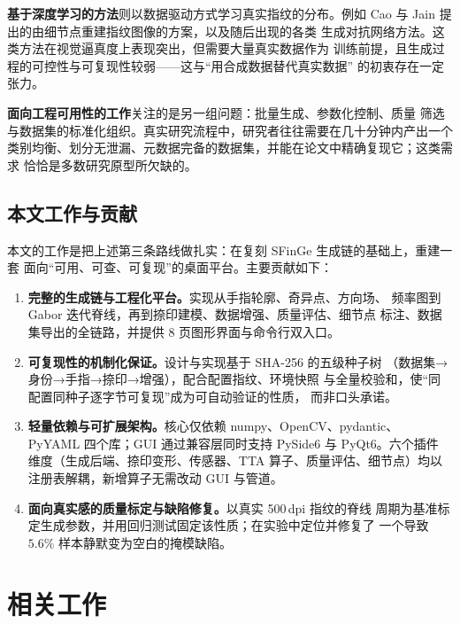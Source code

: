 \documentclass[UTF8, fontset=windows, a4paper, 11pt]{ctexart}
\begin{document}
\textbf{基于深度学习的方法}则以数据驱动方式学习真实指纹的分布。例如 Cao 与
Jain 提出的由细节点重建指纹图像的方案\cite{cao2015}，以及随后出现的各类
生成对抗网络方法。这类方法在视觉逼真度上表现突出，但需要大量真实数据作为
训练前提，且生成过程的可控性与可复现性较弱——这与``用合成数据替代真实数据''
的初衷存在一定张力。

\textbf{面向工程可用性的工作}关注的是另一组问题：批量生成、参数化控制、质量
筛选与数据集的标准化组织。真实研究流程中，研究者往往需要在几十分钟内产出一个
类别均衡、划分无泄漏、元数据完备的数据集，并能在论文中精确复现它；这类需求
恰恰是多数研究原型所欠缺的。

\subsection{本文工作与贡献}

本文的工作是把上述第三条路线做扎实：在复刻 SFinGe 生成链的基础上，重建一套
面向``可用、可查、可复现''的桌面平台。主要贡献如下：

\begin{enumerate}
    \item \textbf{完整的生成链与工程化平台。}实现从手指轮廓、奇异点、方向场、
          频率图到 Gabor 迭代脊线，再到捺印建模、数据增强、质量评估、细节点
          标注、数据集导出的全链路，并提供 8 页图形界面与命令行双入口。
    \item \textbf{可复现性的机制化保证。}设计与实现基于 SHA-256 的五级种子树
          （数据集→身份→手指→捺印→增强），配合配置指纹、环境快照
          与全量校验和，使``同配置同种子逐字节可复现''成为可自动验证的性质，
          而非口头承诺。
    \item \textbf{轻量依赖与可扩展架构。}核心仅依赖 numpy、OpenCV、pydantic、
          PyYAML 四个库；GUI 通过兼容层同时支持 PySide6 与 PyQt6。六个插件
          维度（生成后端、捺印变形、传感器、TTA 算子、质量评估、细节点）均以
          注册表解耦，新增算子无需改动 GUI 与管道。
    \item \textbf{面向真实感的质量标定与缺陷修复。}以真实 500\,dpi 指纹的脊线
          周期为基准标定生成参数，并用回归测试固定该性质；在实验中定位并修复了
          一个导致 $5.6\%$ 样本静默变为空白的掩模缺陷。
\end{enumerate}

\section{相关工作}
\end{document}
